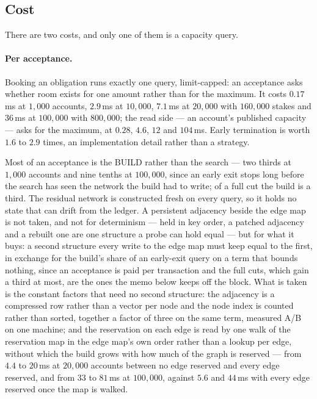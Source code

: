\subsection{Cost}

There are two costs, and only one of them is a capacity query.

\paragraph{Per acceptance.} Booking an obligation runs exactly one query, limit-capped:
an acceptance asks whether room exists for one amount rather than for the maximum. It
costs $0.17$\,ms at $1{,}000$ accounts, $2.9$\,ms at $10{,}000$, $7.1$\,ms at
$20{,}000$ with $160{,}000$ stakes and $36$\,ms at $100{,}000$ with $800{,}000$; the
read side --- an account's published capacity --- asks for the maximum, at $0.28$, $4.6$,
$12$ and $104$\,ms. Early termination is worth $1.6$ to $2.9$ times, an implementation
detail rather than a strategy.

Most of an acceptance is the BUILD rather than the search --- two thirds at $1{,}000$
accounts and nine tenths at $100{,}000$, since an early exit stops long before the search
has seen the network the build had to write; of a full cut the build is a third. The
residual network is constructed fresh on every query, so it holds no state that can drift
from the ledger. A persistent adjacency beside the edge map is not taken, and not for
determinism --- held in key order, a patched adjacency and a rebuilt one are one structure
a probe can hold equal --- but for what it buys: a second structure every write to the
edge map must keep equal to the first, in exchange for the build's share of an early-exit
query on a term that bounds nothing, since an acceptance is paid per transaction and the
full cuts, which gain a third at most, are the ones the memo below keeps off the block.
What is taken is the constant factors that need no second structure: the adjacency is a
compressed row rather than a vector per node and the node index is counted rather than
sorted, together a factor of three on the same term, measured A/B on one machine; and the
reservation on each edge is read by one walk of the reservation map in the edge map's own
order rather than a lookup per edge, without which the build grows with how much of the
graph is reserved --- from $4.4$ to $20$\,ms at $20{,}000$ accounts between no edge
reserved and every edge reserved, and from $33$ to $81$\,ms at $100{,}000$, against $5.6$
and $44$\,ms with every edge reserved once the map is walked.

